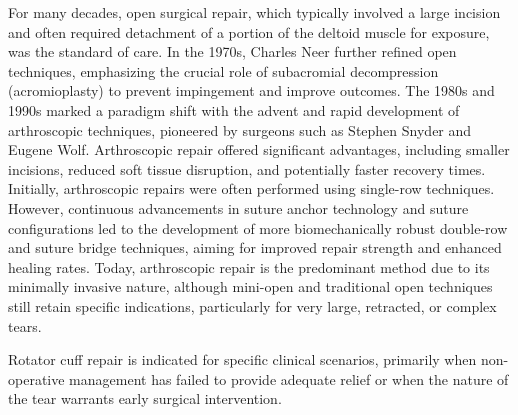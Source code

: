 For many decades, open surgical repair, which typically involved a large incision and often required detachment of a portion of the deltoid muscle for exposure, was the standard of care. In the 1970s, Charles Neer further refined open techniques, emphasizing the crucial role of subacromial decompression (acromioplasty) to prevent impingement and improve outcomes. The 1980s and 1990s marked a paradigm shift with the advent and rapid development of arthroscopic techniques, pioneered by surgeons such as Stephen Snyder and Eugene Wolf. Arthroscopic repair offered significant advantages, including smaller incisions, reduced soft tissue disruption, and potentially faster recovery times. Initially, arthroscopic repairs were often performed using single-row techniques. However, continuous advancements in suture anchor technology and suture configurations led to the development of more biomechanically robust double-row and suture bridge techniques, aiming for improved repair strength and enhanced healing rates. Today, arthroscopic repair is the predominant method due to its minimally invasive nature, although mini-open and traditional open techniques still retain specific indications, particularly for very large, retracted, or complex tears.

Rotator cuff repair is indicated for specific clinical scenarios, primarily when non-operative management has failed to provide adequate relief or when the nature of the tear warrants early surgical intervention.

